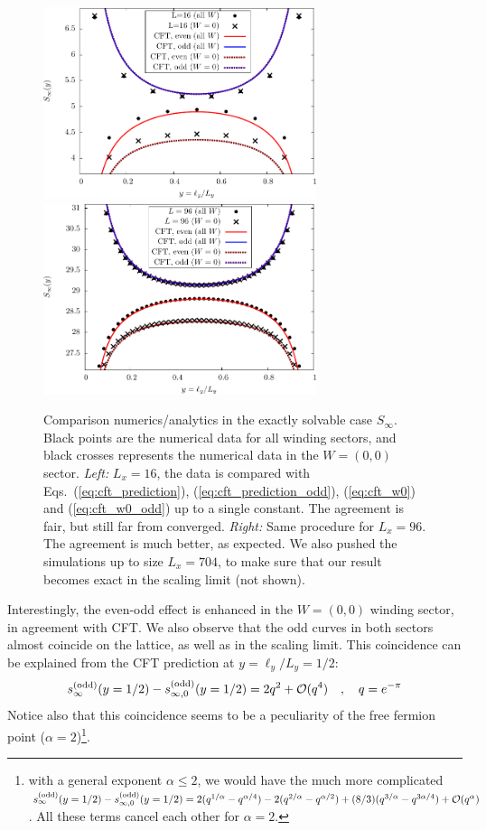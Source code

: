 \documentclass[11pt]{iopart}
\begin{document}
\begin{figure}[ht]
 \begin{center}
  \includegraphics[width=8cm]{./figures/sinfty_16.pdf}
  \includegraphics[width=8cm]{./figures/sinfty_96.pdf}
 \end{center}
\caption{Comparison numerics/analytics in the exactly solvable case $S_\infty$. Black points are the numerical data for all winding sectors, and black crosses represents the numerical data in the $W=(0,0)$ sector. \emph{Left:} $L_x=16$, the data is compared with Eqs.~(\ref{eq:cft_prediction}), (\ref{eq:cft_prediction_odd}),  (\ref{eq:cft_w0}) and (\ref{eq:cft_w0_odd}) up to a single constant. The agreement is fair, but still far from converged. \emph{Right:} Same procedure for $L_x=96$. The agreement is much better, as expected. We also pushed the simulations up to size $L_x=704$, to make sure that our result becomes exact in the scaling limit (not shown).}
\label{fig:Sinfty}
\end{figure}
Interestingly, the even-odd effect is enhanced in the $W=(0,0)$ winding sector, in agreement with CFT. We also observe that the odd curves in both sectors almost coincide on the lattice, as well as in the scaling limit. This coincidence can be explained from the CFT prediction at $y=\ell_y/L_y=1/2$:
\begin{equation}
 s_{\infty}^{\rm (odd)}(y=1/2)-s_{\infty,0}^{\rm (odd)}(y=1/2)=2q^2+\mathcal{O}(q^4) \quad,\quad q=e^{-\pi}
\end{equation}
Notice also that this coincidence seems to be a peculiarity of the free fermion point ($\alpha=2$)\footnote{with a general exponent $\alpha\leq 2$, we would have the much more complicated\\ $s_{\infty}^{\rm (odd)}(y=1/2)-s_{\infty,0}^{\rm (odd)}(y=1/2)=2(q^{1/\alpha}-q^{\alpha/4})-2(q^{2/\alpha}-q^{\alpha/2})+(8/3)(q^{3/\alpha}-q^{3\alpha/4})+\mathcal{O}(q^{\alpha})$. All these terms cancel each other for $\alpha=2$.}. 
\end{document}
